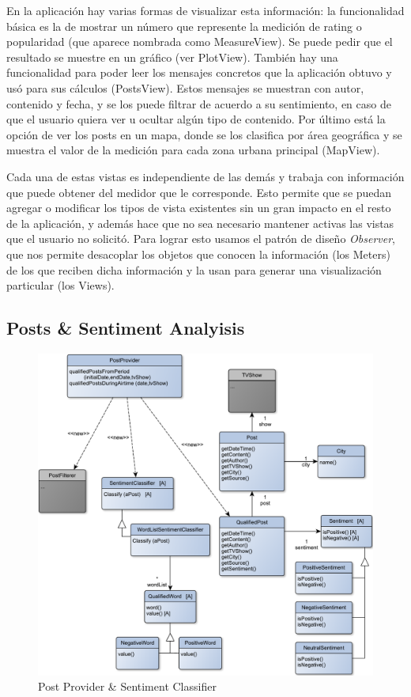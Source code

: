 En la aplicación hay varias formas de visualizar esta información: la funcionalidad básica es la de mostrar un número que represente la medición de rating o popularidad (que aparece nombrada como MeasureView). Se puede pedir que el resultado se muestre en un gráfico (ver PlotView). También hay una funcionalidad para poder leer los mensajes concretos que la aplicación obtuvo y usó para sus cálculos (PostsView). Estos mensajes se muestran con autor, contenido y fecha, y se los puede filtrar de acuerdo a su sentimiento, en caso de que el usuario quiera ver u ocultar algún tipo de contenido. Por último está la opción de ver los posts en un mapa, donde se los clasifica por área geográfica y se muestra el valor de la medición para cada zona urbana principal (MapView).
\medskip

Cada una de estas vistas es independiente de las demás y trabaja con información que puede obtener del medidor que le corresponde. Esto permite que se puedan agregar o modificar los tipos de vista existentes sin un gran impacto en el resto de la aplicación, y además hace que no sea necesario mantener activas las vistas que el usuario no solicitó. Para lograr esto usamos el patrón de diseño \textit{Observer}, que nos permite desacoplar los objetos que conocen la información (los Meters) de los que reciben dicha información y la usan para generar una visualización particular (los Views).

\subsection{Posts \& Sentiment Analyisis}

\begin{figure}[H]
\centering
\includegraphics[width=\textwidth]{graph/clase/classifier.pdf}
\caption{Post Provider \& Sentiment Classifier}
\end{figure}


